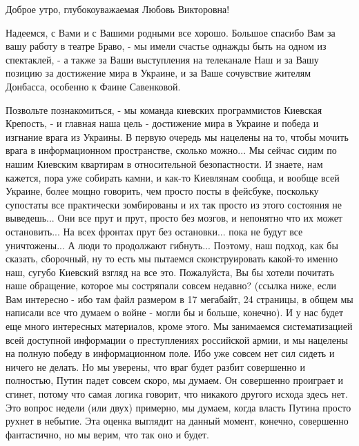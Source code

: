  
 
 
 
 

Доброе утро, глубокоуважаемая Любовь Викторовна!

Надеемся, с Вами и с Вашими родными все хорошо.  Большое спасибо Вам за вашу
работу в театре Браво, - мы имели счастье однажды быть на одном из спектаклей,
- а также за Ваши выступления на телеканале Наш и за Вашу позицию за достижение
мира в Украине, и за Ваше сочувствие жителям Донбасса, особенно к Фаине
Савенковой.

Позвольте познакомиться, - мы команда киевских программистов Киевская Крепость,
- и главная наша цель - достижение мира в Украине и победа и изгнание врага из
Украины. В первую очередь мы нацелены на то, чтобы мочить врага в
информационном пространстве, сколько можно... Мы сейчас сидим по нашим Киевским
квартирам в относительной безопастности.  И знаете, нам кажется, пора уже
собирать камни, и как-то Киевлянам сообща, и вообще всей Украине, более мощно
говорить, чем просто посты в фейсбуке, поскольку супостаты все практически
зомбированы и их так просто из этого состояния не выведешь... Они все прут и
прут, просто без мозгов, и непонятно что их может остановить... На всех фронтах
прут без остановки... пока не будут все уничтожены...  А люди то продолжают
гибнуть...  Поэтому, наш подход, как бы сказать, сборочный, ну то есть мы
пытаемся сконструировать какой-то именно наш, сугубо Киевский взгляд на все
это.  Пожалуйста, Вы бы хотели почитать наше обращение, которое мы состряпали
совсем недавно? (ссылка ниже, если Вам интересно - ибо там файл размером в 17
мегабайт, 24 страницы, в общем мы написали все что думаем о войне - могли бы и
больше, конечно). И у нас будет еще много интересных материалов, кроме этого.
Мы занимаемся систематизацией всей доступной информации о преступлениях
российской армии, и мы нацелены на полную победу в информационном поле. Ибо уже
совсем нет сил сидеть и ничего не делать. Но мы уверены, что враг будет разбит
совершенно и полностью, Путин падет совсем скоро, мы думаем.  Он совершенно
проиграет и сгинет, потому что самая логика говорит, что никакого другого
исхода здесь нет. Это вопрос недели (или двух) примерно, мы думаем, когда
власть Путина просто рухнет в небытие.  Эта оценка выглядит на данный момент,
конечно, совершенно фантастично, но мы верим, что так оно и будет.

